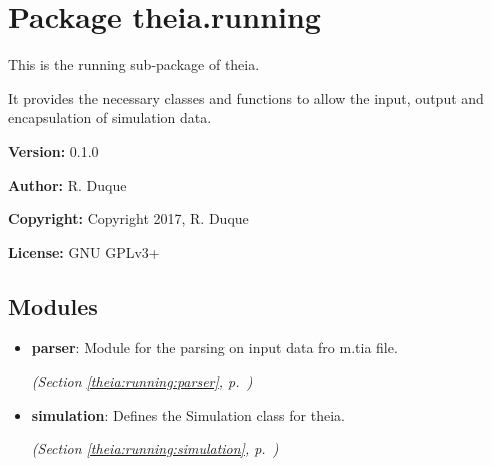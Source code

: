 %
%
%


\section{Package theia.running}

    \label{theia:running}
This is the running sub-package of theia.

It provides the necessary classes and functions to allow the input, output 
and encapsulation of simulation data.

\textbf{Version:} 0.1.0



\textbf{Author:} R. Duque



\textbf{Copyright:} Copyright 2017, R. Duque



\textbf{License:} GNU GPLv3+





\subsection{Modules}

\begin{itemize}
\setlength{\parskip}{0ex}
\item \textbf{parser}: Module for the parsing on input data fro m.tia file.



  \textit{(Section \ref{theia:running:parser}, p.~\pageref{theia:running:parser})}

\item \textbf{simulation}: Defines the Simulation class for theia.



  \textit{(Section \ref{theia:running:simulation}, p.~\pageref{theia:running:simulation})}

\end{itemize}

